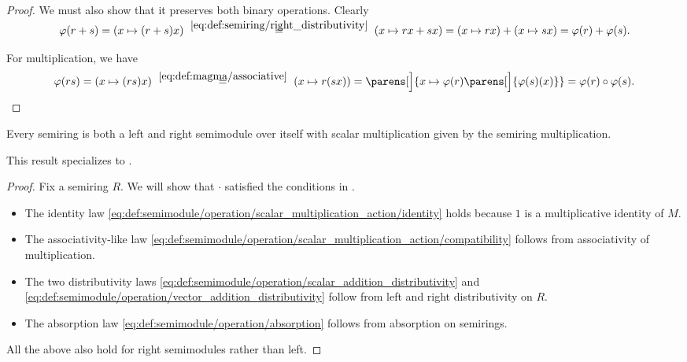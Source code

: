 \begin{proof}
  We must also show that it preserves both binary operations. Clearly
  \begin{equation*}
    \varphi(r + s)
    =
    (x \mapsto (r + s) x)
    \reloset {\eqref{eq:def:semiring/right_distributivity}} =
    (x \mapsto r x + s x)
    =
    (x \mapsto r x) + (x \mapsto s x)
    =
    \varphi(r) + \varphi(s).
  \end{equation*}

  For multiplication, we have
  \begin{equation*}
    \varphi(rs)
    =
    (x \mapsto (rs)x)
    \reloset {\eqref{eq:def:magma/associative}} =
    (x \mapsto r(sx))
    =
    \parens[\Big]{ x \mapsto \varphi(r)\parens[\Big]{ \varphi(s)(x) } }
    =
    \varphi(r) \bincirc \varphi(s).
  \end{equation*}
\end{proof}

\begin{proposition}\label{thm:semiring_is_semimodule}
  Every semiring is both a left and right semimodule over itself with scalar multiplication given by the semiring multiplication.

  This result specializes to .
\end{proposition}
\begin{proof}
  Fix a semiring \( R \). We will show that \( \cdot \) satisfied the conditions in .
  \begin{itemize}
    \item The identity law \eqref{eq:def:semimodule/operation/scalar_multiplication_action/identity} holds because \( 1 \) is a multiplicative identity of \( M \).
    \item The associativity-like law \eqref{eq:def:semimodule/operation/scalar_multiplication_action/compatibility} follows from associativity of multiplication.
    \item The two distributivity laws \eqref{eq:def:semimodule/operation/scalar_addition_distributivity} and \eqref{eq:def:semimodule/operation/vector_addition_distributivity} follow from left and right distributivity on \( R \).
    \item The absorption law \eqref{eq:def:semimodule/operation/absorption} follows from absorption on semirings.
  \end{itemize}

  All the above also hold for right semimodules rather than left.
\end{proof}

